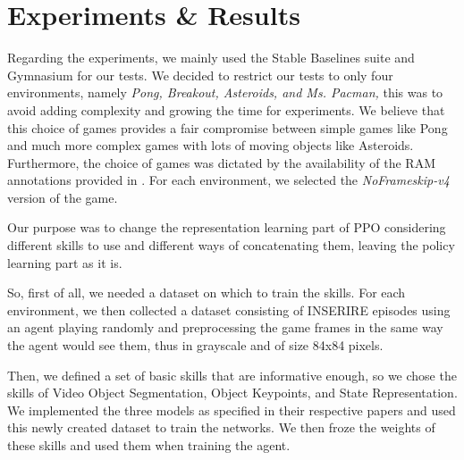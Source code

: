 
\chapter{Experiments \& Results}
\label{sec:experiments}
Regarding the experiments, we mainly used the Stable Baselines suite \cite{stable-baselines} and Gymnasium \cite{towers_gymnasium_2023} for our tests.
We decided to restrict our tests to only four environments, namely \textit{Pong, Breakout, Asteroids, and Ms. Pacman,} this was to avoid adding complexity and growing the time for experiments. We believe that this choice of games provides a fair compromise between simple games like Pong and much more complex games with lots of moving objects like Asteroids.
Furthermore, the choice of games was dictated by the availability of the RAM annotations provided in \cite{anand2019unsupervised}.
For each environment, we selected the \textit{NoFrameskip-v4} version of the game.

Our purpose was to change the representation learning part of PPO considering different skills to use and different ways of concatenating them, leaving the policy learning part as it is.

So, first of all, we needed a dataset on which to train the skills. For each environment, we then collected a dataset consisting of INSERIRE episodes using an agent playing randomly and preprocessing the game frames in the same way the agent would see them, thus in grayscale and of size 84x84 pixels.

Then, we defined a set of basic skills that are informative enough, so we chose the skills of Video Object Segmentation, Object Keypoints, and State Representation.
We implemented the three models as specified in their respective papers and used this newly created dataset to train the networks.
We then froze the weights of these skills and used them when training the agent.

